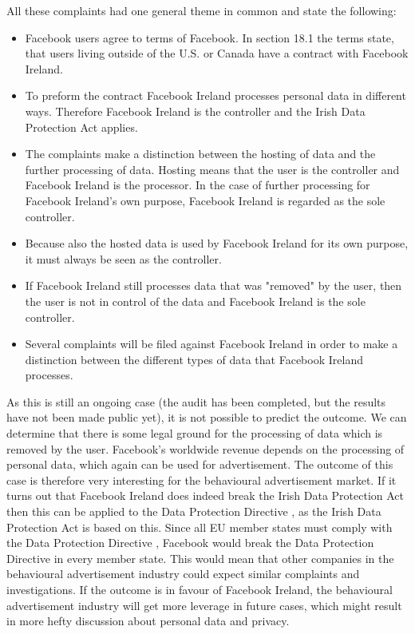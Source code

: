 \documentclass[11pt]{article}
\newcommand{\DPD}{Data Protection Directive }
\begin{document}
All these complaints had one general theme in common and state the following:

\begin{itemize}

\item Facebook users agree to terms of Facebook. In section 18.1 the terms state, that users living outside of the U.S. or Canada have a contract with Facebook Ireland.
\item To preform the contract Facebook Ireland processes personal data in different ways. Therefore Facebook Ireland is the controller and the Irish Data Protection Act applies.
\item The complaints make a distinction between the hosting of data and the further processing of data. Hosting means that the user is the controller and Facebook Ireland is the processor. In the case of further processing for Facebook Ireland's own purpose, Facebook Ireland is regarded as the sole controller.
\item Because also the hosted data is used by Facebook Ireland for its own purpose, it must always be seen as the controller. 
\item If Facebook Ireland still processes data that was "removed" by the user, then the user is not in control of the data and Facebook Ireland is the sole controller.
\item Several complaints will be filed against Facebook Ireland in order to make a distinction between the different types of data that Facebook Ireland processes.

\end{itemize}

As this is still an ongoing case (the audit has been completed, but the results have not been made public yet), it is not possible to predict the outcome. We can determine that there is some legal ground for the processing of data which is removed by the user. Facebook's worldwide revenue depends on the processing of personal data, which again can be used for advertisement. The outcome of this case is therefore very interesting for the behavioural advertisement market. If it turns out that Facebook Ireland does indeed break the Irish Data Protection Act then this can be applied to the \DPD, as the Irish Data Protection Act is based on this. Since all EU member states must comply with the \DPD, Facebook would break the Data Protection Directive in every member state. This would mean that other companies in the behavioural advertisement industry could expect similar complaints and investigations. If the outcome is in favour of Facebook Ireland, the behavioural advertisement industry will get more leverage in future cases, which might result in more hefty discussion about personal data and privacy.
\end{document}
